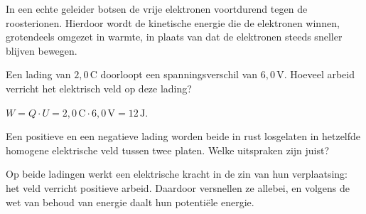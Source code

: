 \documentclass{ximera}
\begin{document}
\begin{remark}[expandable=true,title={In de praktijk}]\nl
In een echte geleider botsen de vrije elektronen voortdurend tegen de roosterionen. Hierdoor wordt de kinetische energie die de elektronen winnen, grotendeels omgezet in warmte, in plaats van dat de elektronen steeds sneller blijven bewegen.
\end{remark}

\begin{question}
    Een lading van $2{,}0 \, \mathrm{C}$ doorloopt een spanningsverschil van $6{,}0 \, \mathrm{V}$. Hoeveel arbeid verricht het elektrisch veld op deze lading?

    \begin{multipleChoice}
    \end{multipleChoice}

    \begin{solution}\nl
        $W = Q \cdot U = 2{,}0 \, \mathrm{C} \cdot 6{,}0 \, \mathrm{V} = 12 \, \mathrm{J}$.
    \end{solution}
\end{question}

\begin{question}
    Een positieve en een negatieve lading worden beide in rust losgelaten in hetzelfde homogene elektrische veld tussen twee platen. Welke uitspraken zijn juist?

    \begin{selectAll}
    \end{selectAll}

    \begin{solution}\nl
        Op beide ladingen werkt een elektrische kracht in de zin van hun verplaatsing: het veld verricht positieve arbeid. Daardoor versnellen ze allebei, en volgens de wet van behoud van energie daalt hun potentiële energie.
    \end{solution}
\end{question}
\end{document}
